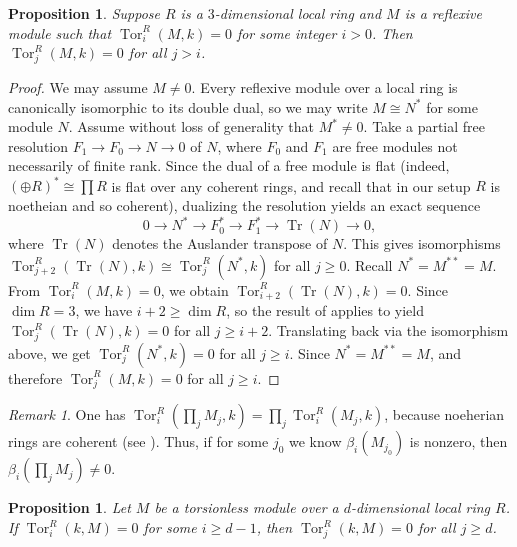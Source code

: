 \documentclass[11pt,a4paper]{amsart}
\numberwithin{equation}{section}
\newtheorem{proposition}[theorem]{Proposition}
\theoremstyle{definition}
\theoremstyle{remark}
\newtheorem{remark}[theorem]{Remark}
\newcommand{\Tor}{\operatorname{Tor}}
\begin{document}
\begin{proposition}
Suppose \(R\) is a \(3\)-dimensional local ring and \(M\) is a reflexive module such that \(\operatorname{Tor}_i^R(M,k)=0\) for some integer \(i>0\). Then \(\operatorname{Tor}_j^R(M,k)=0\) for all \(j>i\).
\end{proposition}
	
\begin{proof}
We may assume $M\neq 0$.	Every reflexive module over a local ring is canonically isomorphic to its double dual, so we may write \(M \cong N^*\) for some module \(N\).   Assume without loss of generality that \(M^*\neq 0\). Take a partial free resolution \(F_1\to F_0\to N\to 0\) of \(N\), where \(F_0\) and \(F_1\) are  free modules not necessarily of finite rank. Since the dual of a free module is flat (indeed, \((\oplus R)^*\cong \prod R\) is flat  over any coherent rings, and recall that in our setup $R$  is noetheian and so coherent), dualizing the resolution yields an exact sequence
\[0 \longrightarrow N^* \longrightarrow F_0^* \longrightarrow F_1^* \longrightarrow \operatorname{Tr}(N) \longrightarrow 0,
		\]
where \(\operatorname{Tr}(N)\) denotes the Auslander transpose of \(N\). This gives isomorphisms \(\operatorname{Tor}_{j+2}^R(\operatorname{Tr}(N),k)\cong \operatorname{Tor}_j^R(N^*,k)\) for all \(j\ge 0\). Recall $N^\ast= M^{\ast\ast}=M$. From \(\operatorname{Tor}_i^R(M,k)=0\), we obtain \(\operatorname{Tor}_{i+2}^R(\operatorname{Tr}(N),k)=0\). Since \(\dim R=3\), we have \(i+2\ge \dim R\), so the result of \cite[1.1]{IYENGAR} applies to yield \(\operatorname{Tor}_j^R(\operatorname{Tr}(N),k)=0\) for all \(j\ge i+2\). Translating back via the isomorphism above, we get \(\operatorname{Tor}_j^R(N^*,k)=0\) for all \(j\ge i\). Since \(N^\ast= M^{\ast\ast}=M\), and therefore \(\operatorname{Tor}_j^R(M,k)=0\) for all \(j\ge i\).
	\end{proof}


\begin{remark}	One has $\Tor_i^R(\prod_j M_j,k) =\prod_j\Tor_i^R( M_j,k) $, because noeherian rings are coherent (see \cite[3.2.26]{en}). Thus, if for some $j_0$ we know  $\beta_i(M_{j_0})$ is nonzero, then  $\beta_i(\prod_jM_j)\neq 0$.
\end{remark}



\begin{proposition}
Let \(M\) be a torsionless module over a \(d\)-dimensional local ring \(R\). If \(\operatorname{Tor}_i^R(k,M)=0\) for some \(i\ge d-1\), then \(\operatorname{Tor}_j^R(k,M)=0\) for all \(j\ge d\).
\end{proposition}
\end{document}
